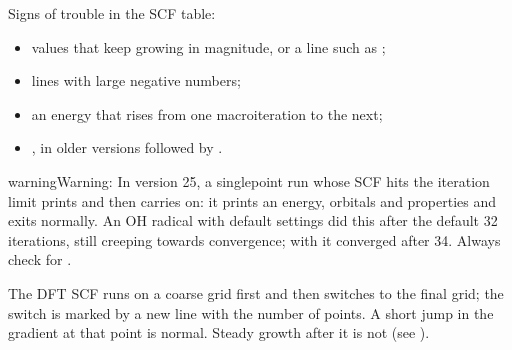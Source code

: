 \documentclass[letterpaper,10pt,english,openany,oneside]{sphinxmanual}
\begin{document}
\sphinxAtStartPar
Signs of trouble in the SCF table:
\begin{itemize}
\item {} 
\sphinxAtStartPar
{} values that keep growing in magnitude, or a line such as ;

\item {} 
\sphinxAtStartPar
{} lines with large negative numbers;

\item {} 
\sphinxAtStartPar
an energy that rises from one macro\sphinxhyphen{}iteration to the next;

\item {} 
\sphinxAtStartPar
{}, in older versions followed by .

\end{itemize}



\begin{sphinxadmonition}{warning}{Warning:}
\sphinxAtStartPar
In version 25, a single\sphinxhyphen{}point run whose SCF hits the iteration limit prints  and then carries on:
it prints an energy, orbitals and properties and exits normally. An OH radical with default settings did this after
the default 32 iterations, still creeping towards convergence; with  it converged after 34. Always
check for .
\end{sphinxadmonition}



\sphinxAtStartPar
The DFT SCF runs on a coarse grid first and then switches to the final grid; the switch is marked by a new
 line with the number of points. A short jump in the gradient at that point is normal. Steady growth after it is not (see
{\hyperref[\detokenize{troubleshooting/common-problems:troubleshooting-fine-grid}]{}}).
\end{document}
